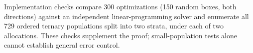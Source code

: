 Implementation checks compare 300 optimizations (150 random boxes, both directions) against an independent linear-programming solver and enumerate all 729 ordered ternary populations split into two strata, under each of two allocations. These checks supplement the proof; small-population tests alone cannot establish general error control.


